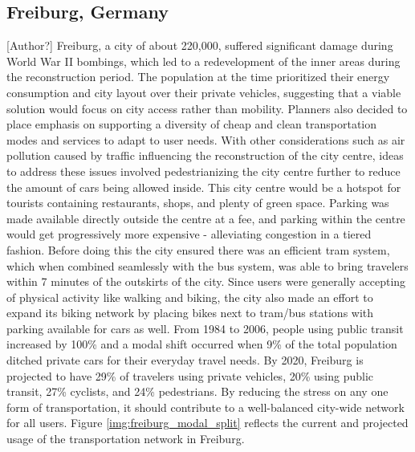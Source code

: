 \documentclass[12pt]{article}                         %
\begin{document}
\subsection{Freiburg, Germany}[Author?]
Freiburg, a city of about 220,000, suffered significant damage during World War II bombings, which led to a redevelopment of the inner areas during the reconstruction period. The population at the time prioritized their energy consumption and city layout over their private vehicles, suggesting that a viable solution would focus on city access rather than mobility. Planners also decided to place emphasis on supporting a diversity of cheap and clean transportation modes and services to adapt to user needs. With other considerations such as air pollution caused by traffic influencing the reconstruction of the city centre, ideas to address these issues involved pedestrianizing the city centre further to reduce the amount of cars being allowed inside. This city centre would be a hotspot for tourists containing restaurants, shops, and plenty of green space. Parking was made available directly outside the centre at a fee, and parking within the centre would get progressively more expensive - alleviating congestion in a tiered fashion. Before doing this the city ensured there was an efficient tram system, which when combined seamlessly with the bus system, was able to bring travelers within 7 minutes of the outskirts of the city. Since users were generally accepting of physical activity like walking and biking, the city also made an effort to expand its biking network by placing bikes next to tram/bus stations with parking available for cars as well. From 1984 to 2006, people using public transit increased by 100\% and a modal shift occurred when 9\% of the total population ditched private cars for their everyday travel needs.  By 2020, Freiburg is projected to have 29\% of travelers using private vehicles, 20\% using public transit, 27\% cyclists, and 24\% pedestrians. By reducing the stress on any one form of transportation, it should contribute to a well-balanced city-wide network for all users. Figure \ref{img:freiburg_modal_split} reflects the current and projected usage of the transportation network in Freiburg.
\end{document}
